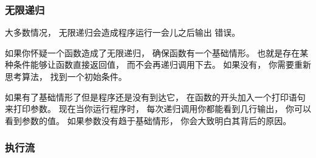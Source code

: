 \subsubsection{无限递归}



大多数情况， 无限递归会造成程序运行一会儿之后输出
 错误。


如果你怀疑一个函数造成了无限递归， 确保函数有一个基础情形。
也就是存在某种条件能够让函数直接返回值， 而不会再递归调用下去。
如果没有， 你需要重新思考算法， 找到一个初始条件。


如果有了基础情形了但是程序还是没有到达它， 在函数的开头加入一个打印语句来打印参数。
现在当你运行程序时， 每次递归调用你都能看到几行输出， 你可以看到参数的值。
如果参数没有趋于基础情形， 你会大致明白其背后的原因。

\subsubsection{执行流}


